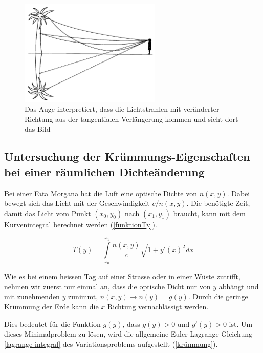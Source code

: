 \begin{figure}[H]
\begin{center}
\includegraphics[width=0.6\textwidth]{./picture/FataEinleitung.png}
	\caption{Das Auge interpretiert, dass die Lichtstrahlen mit veränderter Richtung aus der tangentialen Verlängerung kommen und sieht dort das Bild}
	\label{Ab:fataEinleitung}
\end{center}	
\end{figure}


\subsection{Untersuchung der Krümmungs-Eigenschaften bei einer räumlichen Dichteänderung \label{sec:Krümmung}}

Bei einer Fata Morgana hat die Luft eine optische Dichte von $n(x,y)$. 
Dabei bewegt sich das Licht mit der Geschwindigkeit $c/n(x,y)$. 
Die benötigte Zeit, damit das Licht vom Punkt $(x_0, y_0)$ nach $(x_1, y_1)$ braucht,
kann mit dem Kurvenintegral berechnet werden (\eqref{funktionTy}).

\begin{equation}
	T(y) = \int \limits_{x_0}^{x_1} \frac{n(x,y)}{c} \sqrt{1 + y'(x)^2} dx
	\label{funktionTy}
\end{equation}

Wie es bei einem heissen Tag auf einer Strasse oder in einer Wüste zutrifft,
nehmen wir zuerst nur einmal an, dass die optische Dicht nur von $y$ abhängt und mit zunehmenden $y$ zunimmt,
$n(x,y) \rightarrow n(y)=g(y)$.
Durch die geringe Krümmung der Erde kann die $x$ Richtung vernachlässigt werden.

Dies bedeutet für die Funktion $g(y)$, dass $g(y) > 0$ und $g'(y) > 0 $ ist.
Um dieses Minimalproblem zu lösen, wird die allgemeine Euler-Lagrange-Gleichung  \eqref{lagrange-integral} des Variationsproblems aufgestellt (\eqref{krümmung}).

